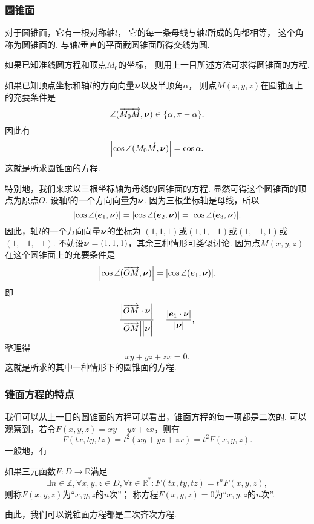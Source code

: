 \subsubsection{圆锥面}
对于圆锥面，它有一根对称轴\(l\)，
它的每一条母线与轴\(l\)所成的角都相等，
这个角称为圆锥面的.
与轴\(l\)垂直的平面截圆锥面所得交线为圆.

如果已知准线圆方程和顶点\(M_0\)的坐标，
则用上一目所述方法可求得圆锥面的方程.

如果已知顶点坐标和轴\(l\)的方向向量\(\boldsymbol{\nu}\)以及半顶角\(\alpha\)，
则点\(M(x,y,z)\)在圆锥面上的充要条件是\[
	\angle(\overrightarrow{M_0 M},\boldsymbol{\nu}) \in \{ \alpha, \pi - \alpha \}.
\]
因此有\begin{equation}
	\abs{\cos\angle(\overrightarrow{M_0 M},\boldsymbol{\nu})} = \cos\alpha.
\end{equation}
这就是所求圆锥面的方程.

特别地，我们来求以三根坐标轴为母线的圆锥面的方程.
显然可得这个圆锥面的顶点为原点\(O\).
设轴\(l\)的一个方向向量为\(\boldsymbol{\nu}\).
因为三根坐标轴是母线，所以\[
	\abs{\cos\angle(\boldsymbol{e}_1,\boldsymbol{\nu})}
	= \abs{\cos\angle(\boldsymbol{e}_2,\boldsymbol{\nu})}
	= \abs{\cos\angle(\boldsymbol{e}_3,\boldsymbol{\nu})}.
\]
因此，轴\(l\)的一个方向向量\(\boldsymbol{\nu}\)的坐标为
\((1,1,1)\)或\((1,1,-1)\)或\((1,-1,1)\)或\((1,-1,-1)\).
不妨设\(\boldsymbol{\nu}=(1,1,1)\)，其余三种情形可类似讨论.
因为点\(M(x,y,z)\)在这个圆锥面上的充要条件是\[
	\abs{\cos\angle(\overrightarrow{OM},\boldsymbol{\nu})}
	= \abs{\cos\angle(\boldsymbol{e}_1,\boldsymbol{\nu})}.
\]
即\[
	\frac{\abs{\vec{OM}\cdot\mat{\nu}}}{\abs{\vec{OM}}\abs{\mat{\nu}\vphantom{\vec{OM}}}}
	= \frac{\abs{\mat{e}_1\cdot\mat{\nu}}}{\abs{\mat{\nu}}},
\]
整理得\[
	xy+yz+zx=0.
\]
这就是所求的其中一种情形下的圆锥面的方程.

\subsubsection{锥面方程的特点}
我们可以从上一目的圆锥面的方程可以看出，锥面方程的每一项都是二次的.
可以观察到，若令\(F(x,y,z) = xy+yz+zx\)，则有\[
	F(tx,ty,tz) = t^2(xy+yz+zx)
	= t^2 F(x,y,z).
\]
一般地，有
\begin{definition}
如果三元函数\(F\colon D \to \mathbb{R}\)满足\[
	\exists n\in\mathbb{Z},
	\forall x,y,z \in D,
	\forall t\in\mathbb{R}^*:
	F(tx,ty,tz) = t^n F(x,y,z),
\]
则称\(F(x,y,z)\)为“\(x,y,z\)的\(n\)次”；
称方程\(F(x,y,z)=0\)为“\(x,y,z\)的\(n\)次”.
\end{definition}

由此，我们可以说锥面方程都是二次齐次方程.

